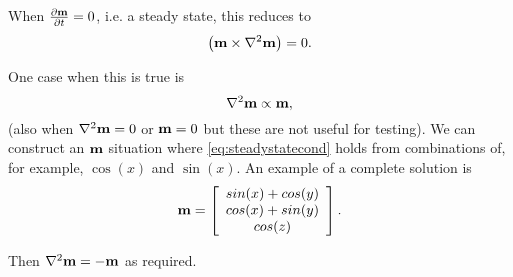 When $\frac{\partial \mathbf{m}}{\partial t} = 0$, i.e. a steady state, this reduces to
\begin{equation}
   \left( \mathbf{m} \times \nabla^2 \mathbf{m} \right) = 0.
\end{equation}

One case when this is true is
\begin{equation}
  \nabla^2 \mathbf{m} \propto \mathbf{m},
  \label{eq:steadystatecond}
\end{equation}
(also when $\nabla^2 \mathbf{m} = 0$ or $\mathbf{m} = 0$ but these are not useful for testing).
We can construct an $\mathbf{m}$ situation where \eqref{eq:steadystatecond} holds from combinations of, for example, $\cos(x)$ and $\sin(x)$.
An example of a complete solution is
\begin{equation}
  \mathbf{m} = \left[
    \begin{array}{c}
      sin(x) + cos(y) \\ cos(x) + sin(y) \\ cos(z)
    \end{array}
    \right].
\end{equation}

Then $\nabla^2 \mathbf{m} = - \mathbf{m}$ as required.
